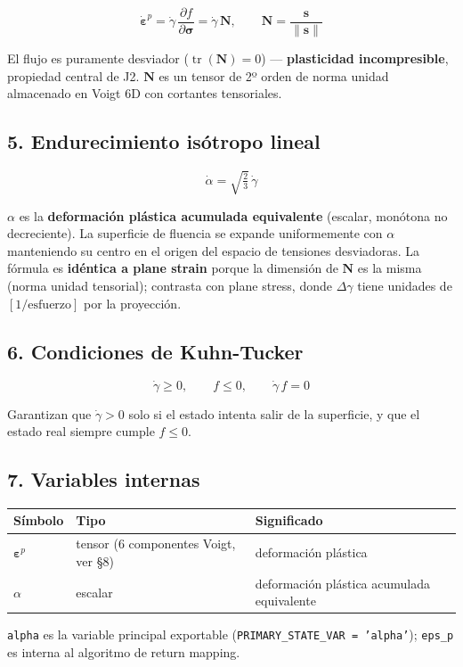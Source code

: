 \documentclass[11pt,letterpaper,oneside]{report}
\begin{document}
\[
\dot{\boldsymbol\varepsilon}^p = \dot\gamma\,\frac{\partial f}{\partial\boldsymbol\sigma} = \dot\gamma\,\mathbf N, \qquad \mathbf N = \frac{\mathbf s}{\|\mathbf s\|}
\]

El flujo es puramente desviador ($\operatorname{tr}(\mathbf N) = 0$) --- \textbf{plasticidad incompresible}, propiedad central de J2. $\mathbf N$ es un tensor de 2º orden de norma unidad almacenado en Voigt 6D con cortantes tensoriales.

\subsection{5. Endurecimiento isótropo lineal}

\[
\dot\alpha = \sqrt{\tfrac{2}{3}}\,\dot\gamma
\]

$\alpha$ es la \textbf{deformación plástica acumulada equivalente} (escalar, monótona no decreciente). La superficie de fluencia se expande uniformemente con $\alpha$ manteniendo su centro en el origen del espacio de tensiones desviadoras. La fórmula es \textbf{idéntica a plane strain} porque la dimensión de $\mathbf N$ es la misma (norma unidad tensorial); contrasta con plane stress, donde $\Delta\gamma$ tiene unidades de $[1/\text{esfuerzo}]$ por la proyección.

\subsection{6. Condiciones de Kuhn-Tucker}

\[
\dot\gamma \geq 0, \qquad f \leq 0, \qquad \dot\gamma\,f = 0
\]

Garantizan que $\dot\gamma > 0$ solo si el estado intenta salir de la superficie, y que el estado real siempre cumple $f \leq 0$.

\subsection{7. Variables internas}

\begin{center}
\begin{tabularx}{\textwidth}{YYY}
\hline
\textbf{Símbolo} & \textbf{Tipo} & \textbf{Significado} \\
\hline
$\boldsymbol\varepsilon^p$ & tensor (6 componentes Voigt, ver §8) & deformación plástica \\
$\alpha$ & escalar & deformación plástica acumulada equivalente \\
\hline
\end{tabularx}
\end{center}
\texttt{alpha} es la variable principal exportable (\texttt{PRIMARY\_STATE\_VAR = 'alpha'}); \texttt{eps\_p} es interna al algoritmo de return mapping.
\end{document}
